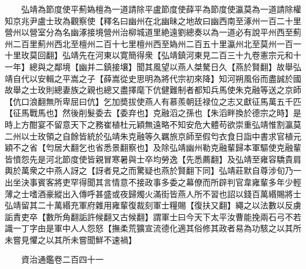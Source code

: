 　　弘靖為節度使平薊媯檀為一道請除平盧節度使薛平為節度使瀛莫為一道請除權知京兆尹盧士玫為觀察使【釋名曰幽州在北幽昧之地故曰幽西南至涿州一百二十里營州以營室分為名幽涿接境營州治柳城道里絶遠劉總奏以為一道必有說平州西至薊州二百里薊州西北至檀州二百十七里檀州西至媯州二百五十里瀛州北至莫州一百一十里玫莫回翻】弘靖先在河東以寛簡得衆【弘靖鎮河東見二百三十九卷憲宗元和十一年】總與之鄰境【幽并二鎮接壤】聞其風望以燕人桀驁日久【燕於賢翻】故舉弘靖自代以安輯之平嵩之子【薛嵩從史思明為將代宗初來降】知河朔風俗而盡誠於國故舉之士玫則總妻族之親也總又盡擇麾下伉健難制者都知兵馬使朱克融等送之京師【伉口浪翻無所卑屈曰伉】乞加奬拔使燕人有慕羨朝廷禄位之志又獻征馬萬五千匹【征馬戰馬也】然後削髮委去【委弃也】克融滔之孫也【朱滔畔換於德宗之時】是時上方酣宴不留意天下之務崔植杜元穎無遠略不知安危大體苟欲崇重弘靖惟割瀛莫二州以士玫領之自餘皆統於弘靖朱克融等久羈旅京師至假匄衣食日詣中書求官植元穎不之省【匄居大翻乞也省悉景翻察也】及除弘靖幽州勒克融輩歸本軍驅使克融輩皆憤怨先是河北節度使皆親冒寒暑與士卒均勞逸【先悉薦翻】及弘靖至雍容驕貴肩輿於萬衆之中燕人訝之【訝者見之而驚疑也燕於賢翻下同】弘靖莊默自尊涉旬乃一出坐決事賓客將吏罕得聞其言情意不接政事多委之幕僚而所辟判官韋雍輩多年少輕薄之士嗜酒豪縱出入傳呼甚盛或夜歸燭火滿街皆燕人所不習也詔以錢百萬緡賜將士弘靖留其二十萬緡充軍府雜用雍輩復裁刻軍士糧賜【復扶又翻】繩之以法數以反虜詬責吏卒【數所角翻詬許候翻又古候翻】謂軍士曰今天下太平汝曹能挽兩石弓不若識一丁字由是軍中人人怨怒【撫柔荒獷宣流德化適其俗修其政者易為功駭之以其所未嘗見懼之以其所未嘗聞鮮不速禍】

　　資治通鑑卷二百四十一  
    


 


 



 

 
  







 


　　
　　
　
　
　


　　

　















